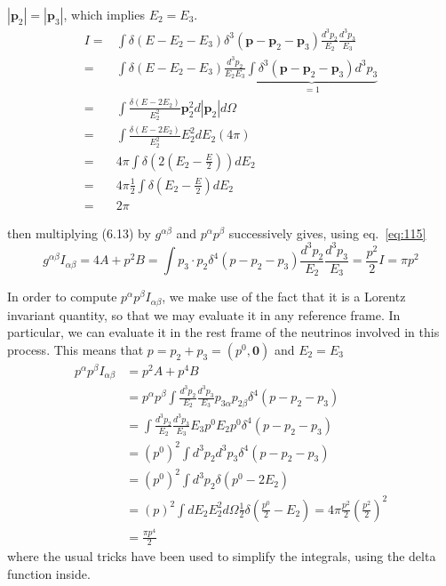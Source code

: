 $|\mathbf{p}_2|=|\mathbf{p}_3|$, which implies $E_2=E_3$.
\begin{align}
  I=&\int\delta(E-E_2-E_3)\delta^3(\mathbf{p}-\mathbf{p}_2-\mathbf{p}_3)\frac{d^3 p_2}{E_2}\frac{d^3 p_3}{E_3}\nonumber\\
    =&\int\delta(E-E_2-E_3)\frac{d^3 p_2}{E_2E_3}\underbrace{\int\delta^3(\mathbf{p}-\mathbf{p}_2-\mathbf{p}_3)d^3 p_3}_{=1}\nonumber\\
    =&\int\frac{\delta(E-2E_2)}{E_2^2}\mathbf{p}_2^2 d|\mathbf{p}_2|d\Omega\nonumber\\
    =&\int\frac{\delta(E-2E_2)}{E_2^2}E_2^2 dE_2 (4\pi)\nonumber\\
    =&4\pi\int\delta\left(2\left(E_2-\frac{E}{2}\right)\right) dE_2 \nonumber\\
    =&4\pi\frac{1}{2}\int\delta\left(E_2-\frac{E}{2}\right) dE_2 \nonumber\\
    =&2\pi
\end{align}

then multiplying (6.13) by $g^{\alpha\beta}$ and $p^\alpha p^\beta$ successively gives, using eq.~\eqref{eq:115}
\begin{equation}
  g^{\alpha\beta}I_{\alpha\beta}=4 A +p^2 B=\int p_{3}\cdot
  p_{2}\delta^4(p-p_2-p_3)\frac{d^3 p_2}{E_2}\frac{d^3
    p_3}{E_3}\nonumber =\frac{p^2}{2}I=\pi p^2\nonumber
\end{equation}

In order to compute $p^\alpha p^\beta I_{\alpha\beta}$, we make use of
the fact that it is a Lorentz invariant quantity, so that we may
evaluate it in any reference frame. In particular, we can evaluate it
in the rest frame of the neutrinos involved in this process. This
means that $p=p_2+p_3=(p^0,\mathbf{0})$ and $E_2=E_3$
\begin{align}
p^\alpha p^\beta I_{\alpha\beta}&=p^2 A+p^4 B\\ 
&=p^\alpha
p^\beta\int\frac{d^3 p_2}{E_2}\frac{d^3 p_3}{E_3}
p_{3\alpha}p_{2\beta}\delta^4(p-p_2-p_3) \nonumber\\
&=\int \frac{d^3
  p_2}{E_2}\frac{d^3 p_3}{E_3} E_3p^0E_2p^0\delta^4(p-p_2-p_3)\nonumber\\
&=(p^0)^2\int d^3 p_2d^3 p_3
\delta^4(p-p_2-p_3)\\
&=(p^0)^2\int d^3 p_2 \delta(p^0-2E_2)\nonumber\\
&=(p)^2\int d E_2 E_2^2 d\Omega
\frac{1}{2}\delta(\frac{p^0}{2}-E_2) 
=4\pi\frac{p^2}{2}\left(\frac{p^2}{2}\right)^2 \nonumber\\
&=\frac{\pi p^4}{2}
\end{align}
where the usual tricks have been used to simplify the integrals, using
the delta function inside.

